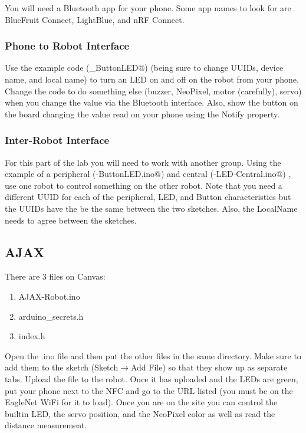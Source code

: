 You will need a Bluetooth app for your phone. Some app names to look for are BlueFruit Connect,
LightBlue, and nRF Connect.

\subsubsection{Phone to Robot Interface}
Use the example code (\lstinline@BLE_ButtonLED@) (being sure to change UUIDs, device name, and local name)
to turn an LED on and off on the robot from your phone. Change the code to 
do something else (buzzer, NeoPixel, motor (carefully), servo) when you change 
the value via the Bluetooth interface. Also, show the button on the board changing
the value read on your phone using the Notify property.

\subsubsection{Inter-Robot Interface}
For this part of the lab you will need to work with another group. Using the example 
of a peripheral (\lstinline@BLE-ButtonLED.ino@) and central (\lstinline@BLE-LED-Central.ino@)
, use one robot to control something on the other robot. Note that you need a different UUID
for each of the peripheral, LED, and Button characteristics but the UUIDs have the be the 
same between the two sketches. Also, the LocalName needs to agree between the sketches.


\subsection{AJAX}
There are 3 files on Canvas:
\begin{enumerate}
    \item AJAX-Robot.ino 
    \item arduino\_secrets.h
    \item index.h 
\end{enumerate}
Open the .ino file and then put the other files in the same directory. Make sure
to add them to the sketch (Sketch$\rightarrow$Add File) so that they show up as separate 
tabs. Upload the file to the robot. Once it has uploaded and the LEDs are green,
put your phone next to the NFC and go to the URL listed (you must be on the 
EagleNet WiFi for it to load). Once you are on the site you can control the 
builtin LED, the servo position, and the NeoPixel color as well as read the 
distance measurement.

